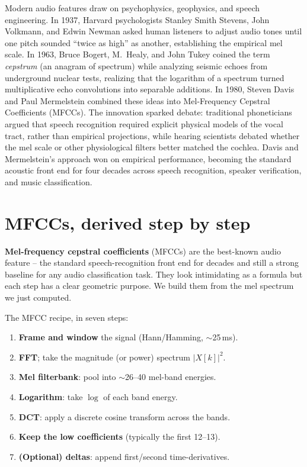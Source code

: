 \begin{historybox}
Modern audio features draw on psychophysics, geophysics, and speech
engineering. In 1937, Harvard psychologists Stanley Smith Stevens, John Volkmann, and
Edwin Newman asked human listeners to adjust audio tones until one pitch sounded ``twice
as high'' as another, establishing the empirical mel scale. In 1963, Bruce Bogert,
M.~Healy, and John Tukey coined the term \emph{cepstrum} (an anagram of spectrum) while
analyzing seismic echoes from underground nuclear tests, realizing that the logarithm of
a spectrum turned multiplicative echo convolutions into separable additions. In 1980,
Steven Davis and Paul Mermelstein combined these ideas into Mel-Frequency Cepstral
Coefficients (MFCCs). The innovation sparked debate: traditional phoneticians
argued that speech recognition required explicit physical models of the vocal tract, rather than empirical projections, while hearing
scientists debated whether the mel scale or other physiological filters better matched the cochlea. Davis and Mermelstein's approach
won on empirical performance, becoming the standard acoustic front end for four decades
across speech recognition, speaker verification, and music classification.
\end{historybox}

\section{MFCCs, derived step by step}
\label{ch27:mfcc}

\textbf{Mel-frequency cepstral coefficients} (MFCCs) are the best-known
audio feature -- the standard speech-recognition front end for decades and still a strong
baseline for any audio classification task. They look intimidating as a formula
but each step has a clear geometric purpose. We build them from the mel
spectrum we just computed.

\begin{focusbox}
The MFCC recipe, in seven steps:
\begin{enumerate}
  \item \textbf{Frame and window} the signal (Hann/Hamming, $\sim$25\,ms).
  \item \textbf{FFT}; take the magnitude (or power) spectrum $|X[k]|^2$.
  \item \textbf{Mel filterbank}: pool into $\sim$26--40 mel-band energies.
  \item \textbf{Logarithm}: take $\log$ of each band energy.
  \item \textbf{DCT}: apply a discrete cosine transform across the bands.
  \item \textbf{Keep the low coefficients} (typically the first 12--13).
  \item \textbf{(Optional) deltas}: append first/second time-derivatives.
\end{enumerate}
\end{focusbox}

